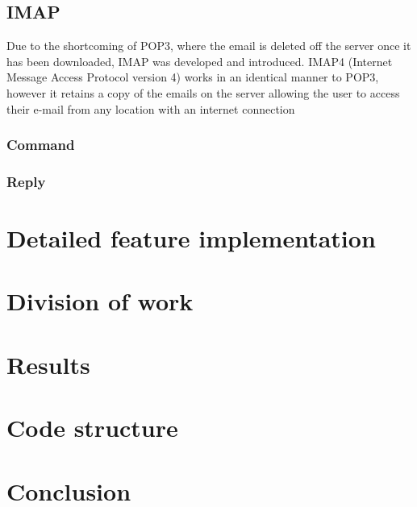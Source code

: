 \documentclass[11pt]{article}
\begin{document}
\begin{multicols}{2}
\subsection{IMAP}
Due to the shortcoming of POP3, where the email is deleted off the server once it has been downloaded, IMAP was developed and introduced. IMAP4 (Internet Message Access Protocol version 4) works in an identical manner to POP3, however it retains a copy of the emails on the server allowing the user to access their e-mail from any location with an internet connection
\subsubsection{Command}

\subsubsection{Reply}


\section{Detailed feature implementation}

\section{Division of work}

\section{Results}

\section{Code structure}

\section{Conclusion}

\end{multicols}
\newpage
\begin{thebibliography}{9}

\end{thebibliography}
\newpage
\appendix
\end{document}
